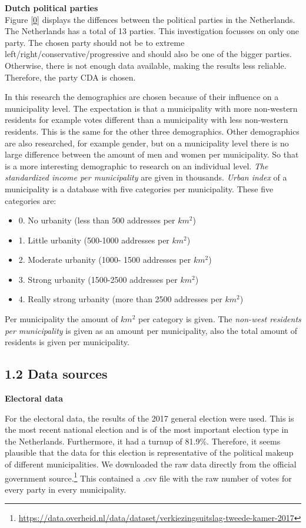 \documentclass[11pt,]{article}
\let\rmarkdownfootnote\footnote%
\def\footnote{\protect\rmarkdownfootnote}
\begin{document}
\textbf{Dutch political parties}\\
Figure \ref{0} displays the diffences between the political parties in
the Netherlands. The Netherlands has a total of 13 parties. This
investigation focusses on only one party. The chosen party should not be
to extreme left/right/conservative/progressive and should also be one of
the bigger parties. Otherwise, there is not enough data available,
making the results less reliable. Therefore, the party CDA is chosen.

In this research the demographics are chosen because of their influence
on a municipality level. The expectation is that a municipality with
more non-western residents for example votes different than a
municipality with less non-western residents. This is the same for the
other three demographics. Other demographics are also researched, for
example gender, but on a municipality level there is no large difference
between the amount of men and women per municipality. So that is a more
interesting demographic to research on an individual level. \emph{The
standardized income per municipality} are given in thousands.
\emph{Urban index} of a municipality is a database with five categories
per municipality. These five categories are:

\begin{itemize}
\item 0. No urbanity (less than 500 addresses per $km^2$)
\item 1. Little urbanity (500-1000 addresses per $km^2$)
\item 2. Moderate urbanity (1000- 1500 addresses per $km^2$)
\item 3. Strong urbanity (1500-2500 addresses per $km^2$) 
\item 4. Really strong urbanity (more than 2500 addresses per $km^2$)
\end{itemize}

Per municipality the amount of \(km^2\) per category is given. The
\emph{non-west residents per municipality} is given as an amount per
municipality, also the total amount of residents is given per
municipality.

\subsection{1.2 Data sources}\label{data-sources}

\textbf{Electoral data}

For the electoral data, the results of the 2017 general election were
used. This is the most recent national election and is of the most
important election type in the Netherlands. Furthermore, it had a turnup
of 81.9\%. Therefore, it seems plausible that the data for this election
is representative of the political makeup of different municipalities.
We downloaded the raw data directly from the official government
source.\footnote{\url{https://data.overheid.nl/data/dataset/verkiezingsuitslag-tweede-kamer-2017}}
This contained a .csv file with the raw number of votes for every party
in every municipality.
\end{document}

